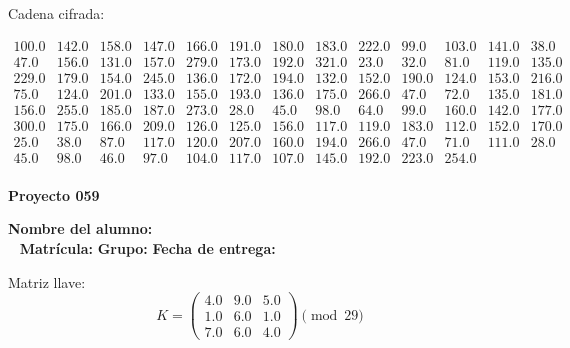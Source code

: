 \documentclass[12pt]{article}
\begin{document}
Cadena cifrada:
\begin{center}
$\begin{array}{lllllllllllll}
100.0 & 142.0 & 158.0 & 147.0 & 166.0 & 191.0 & 180.0 & 183.0 & 222.0 & 99.0 & 103.0 & 141.0 & 38.0\\
47.0 & 156.0 & 131.0 & 157.0 & 279.0 & 173.0 & 192.0 & 321.0 & 23.0 & 32.0 & 81.0 & 119.0 & 135.0\\
229.0 & 179.0 & 154.0 & 245.0 & 136.0 & 172.0 & 194.0 & 132.0 & 152.0 & 190.0 & 124.0 & 153.0 & 216.0\\
75.0 & 124.0 & 201.0 & 133.0 & 155.0 & 193.0 & 136.0 & 175.0 & 266.0 & 47.0 & 72.0 & 135.0 & 181.0\\
156.0 & 255.0 & 185.0 & 187.0 & 273.0 & 28.0 & 45.0 & 98.0 & 64.0 & 99.0 & 160.0 & 142.0 & 177.0\\
300.0 & 175.0 & 166.0 & 209.0 & 126.0 & 125.0 & 156.0 & 117.0 & 119.0 & 183.0 & 112.0 & 152.0 & 170.0\\
25.0 & 38.0 & 87.0 & 117.0 & 120.0 & 207.0 & 160.0 & 194.0 & 266.0 & 47.0 & 71.0 & 111.0 & 28.0\\
45.0 & 98.0 & 46.0 & 97.0 & 104.0 & 117.0 & 107.0 & 145.0 & 192.0 & 223.0 & 254.0\\
\end{array}$
\end{center}

\newpage


\textbf{Proyecto 059}

\textbf{Nombre del alumno:} \underline{\hspace{13cm}}\\\
\vspace{1cm}
\textbf{Matrícula:} \underline{\hspace{4cm}} \hspace{1cm}
\textbf{Grupo:} \underline{\hspace{2cm}}
\textbf{Fecha de entrega:} \underline{\hspace{2cm}}

\medskip

Matriz llave:
\[
K = \begin{pmatrix}
4.0 & 9.0 & 5.0\\
1.0 & 6.0 & 1.0\\
7.0 & 6.0 & 4.0
\end{pmatrix} \pmod{29}
\]
\end{document}
